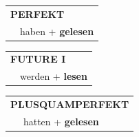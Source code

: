 \documentclass[10pt,a4paper]{revtex4-2}
\begin{document}
\begin{verbbox-acc}
    \vspace{10pt}

 \begin{tabular}{rl}
     \multicolumn{2}{l}{\textbf{PERFEKT}}\\
  &  haben + \textbf{gelesen}\\
  \end{tabular}
\hfill
   \begin{tabular}{rl}
   
    \multicolumn{2}{l}{\textbf{FUTURE I} }\\
  &  werden + \textbf{lesen}\\
 
  \end{tabular}
\hfill
   \begin{tabular}{rl}
      \multicolumn{2}{l}{\textbf{PLUSQUAMPERFEKT}}\\
   & hatten + \textbf{gelesen}\\
  \end{tabular}
  
  \vspace{-5pt}


\end{verbbox-acc}
\end{document}
